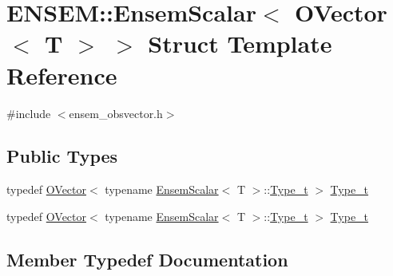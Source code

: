 \hypertarget{structENSEM_1_1EnsemScalar_3_01OVector_3_01T_01_4_01_4}{}\section{E\+N\+S\+EM\+:\+:Ensem\+Scalar$<$ O\+Vector$<$ T $>$ $>$ Struct Template Reference}
\label{structENSEM_1_1EnsemScalar_3_01OVector_3_01T_01_4_01_4}


{\ttfamily \#include $<$ensem\+\_\+obsvector.\+h$>$}

\subsection*{Public Types}
\begin{DoxyCompactItemize}
\item 
typedef \mbox{\hyperlink{classENSEM_1_1OVector}{O\+Vector}}$<$ typename \mbox{\hyperlink{structENSEM_1_1EnsemScalar}{Ensem\+Scalar}}$<$ T $>$\+::\mbox{\hyperlink{structENSEM_1_1EnsemScalar_3_01OVector_3_01T_01_4_01_4_a5b4151f8ecc24331a77edc8130f525f7}{Type\+\_\+t}} $>$ \mbox{\hyperlink{structENSEM_1_1EnsemScalar_3_01OVector_3_01T_01_4_01_4_a5b4151f8ecc24331a77edc8130f525f7}{Type\+\_\+t}}
\item 
typedef \mbox{\hyperlink{classENSEM_1_1OVector}{O\+Vector}}$<$ typename \mbox{\hyperlink{structENSEM_1_1EnsemScalar}{Ensem\+Scalar}}$<$ T $>$\+::\mbox{\hyperlink{structENSEM_1_1EnsemScalar_3_01OVector_3_01T_01_4_01_4_a5b4151f8ecc24331a77edc8130f525f7}{Type\+\_\+t}} $>$ \mbox{\hyperlink{structENSEM_1_1EnsemScalar_3_01OVector_3_01T_01_4_01_4_a5b4151f8ecc24331a77edc8130f525f7}{Type\+\_\+t}}
\end{DoxyCompactItemize}


\subsection{Member Typedef Documentation}
\mbox{\label{structENSEM_1_1EnsemScalar_3_01OVector_3_01T_01_4_01_4_a5b4151f8ecc24331a77edc8130f525f7}} 
